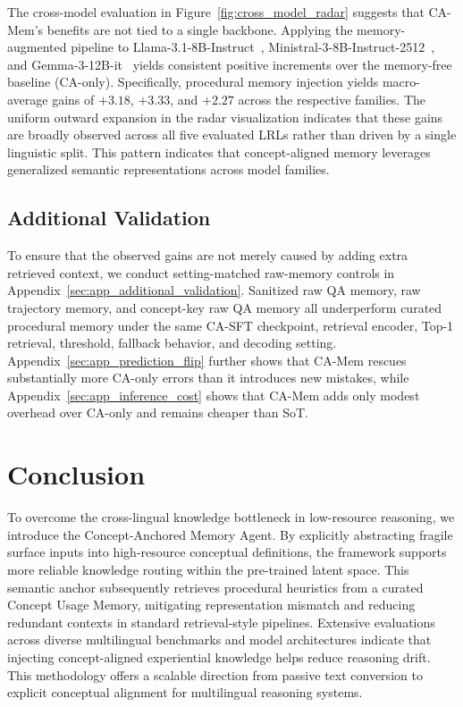\documentclass[11pt]{article}
\begin{document}
The cross-model evaluation in Figure~\ref{fig:cross_model_radar} suggests that CA-Mem's benefits are not tied to a single backbone.
Applying the memory-augmented pipeline to Llama-3.1-8B-Instruct~\citep{grattafiori2024llama}, Ministral-3-8B-Instruct-2512~\citep{liu2026ministral}, and Gemma-3-12B-it~\citep{gemma2025gemma3} yields consistent positive increments over the memory-free baseline (CA-only).
Specifically, procedural memory injection yields macro-average gains of $+3.18$, $+3.33$, and $+2.27$ across the respective families.
The uniform outward expansion in the radar visualization indicates that these gains are broadly observed across all five evaluated LRLs rather than driven by a single linguistic split.
This pattern indicates that concept-aligned memory leverages generalized semantic representations across model families.

\subsection{Additional Validation}
\vspace{-0.25em}
To ensure that the observed gains are not merely caused by adding extra retrieved context, we conduct setting-matched raw-memory controls in Appendix~\ref{sec:app_additional_validation}. Sanitized raw QA memory, raw trajectory memory, and concept-key raw QA memory all underperform curated procedural memory under the same CA-SFT checkpoint, retrieval encoder, Top-1 retrieval, threshold, fallback behavior, and decoding setting. Appendix~\ref{sec:app_prediction_flip} further shows that CA-Mem rescues substantially more CA-only errors than it introduces new mistakes, while Appendix~\ref{sec:app_inference_cost} shows that CA-Mem adds only modest overhead over CA-only and remains cheaper than SoT.

\vspace{-0.8em}
\section{Conclusion}
\vspace{-0.55em}

To overcome the cross-lingual knowledge bottleneck in low-resource reasoning, we introduce the Concept-Anchored Memory Agent.
By explicitly abstracting fragile surface inputs into high-resource conceptual definitions, the framework supports more reliable knowledge routing within the pre-trained latent space.
This semantic anchor subsequently retrieves procedural heuristics from a curated Concept Usage Memory, mitigating representation mismatch and reducing redundant contexts in standard retrieval-style pipelines.
Extensive evaluations across diverse multilingual benchmarks and model architectures indicate that injecting concept-aligned experiential knowledge helps reduce reasoning drift.
This methodology offers a scalable direction from passive text conversion to explicit conceptual alignment for multilingual reasoning systems.
\end{document}
